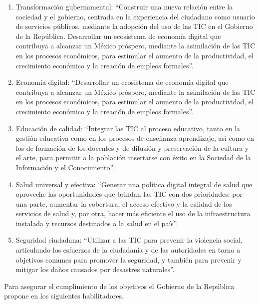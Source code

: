 \documentclass[runningheads,a4paper]{llncs}
\begin{document}
\begin{enumerate}
	\item Transformación gubernamental: ``Construir una nueva relación entre la sociedad y el gobierno,
centrada en la experiencia del ciudadano como usuario de servicios públicos, mediante la adopción del uso de las TIC en el Gobierno de la República. Desarrollar un ecosistema de economía digital que contribuya a alcanzar un México próspero, mediante la asimilación de las \gls{TIC} en los procesos económicos, para estimular el aumento de la productividad, el crecimiento económico y la creación de empleos formales''.\\
	\item Economía digital: ``Desarrollar un ecosistema de economía digital que contribuya a alcanzar un México próspero, mediante la asimilación de las \gls{TIC} en los procesos económicos, para estimular el aumento de la productividad, el crecimiento económico y la creación de empleos formales''.\\
	\item Educación de calidad: ``Integrar las \gls{TIC} al proceso educativo, tanto en la gestión educativa como en los procesos de enseñanza-aprendizaje, así como en los de formación de los docentes y de difusión y preservación de la cultura y el arte, para permitir a la población insertarse con éxito en la Sociedad de la Información y el Conocimiento''.\\
	\item Salud universal y efectiva: ``Generar una política digital integral de salud que aproveche las oportunidades que brindan las \gls{TIC} con dos prioridades: por una parte, aumentar la cobertura, el acceso efectivo y la calidad de los servicios de salud y, por otra, hacer más eficiente el uso de la infraestructura instalada y recursos destinados a la salud en el país''.\\
	\item Seguridad ciudadana: ``Utilizar a las \gls{TIC} para prevenir la violencia social, articulando los esfuerzos de la ciudadanía y de las autoridades en torno a objetivos comunes para promover la seguridad, y también para prevenir y mitigar los daños causados por desastres naturales''.
\end{enumerate}

Para asegurar el cumplimiento de los objetivos el Gobierno de la República propone en \cite{EDN_1} los siguientes habilitadores.
\end{document}
